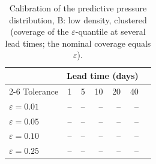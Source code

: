 \begin{table}[htbp]
\centering
\caption{Calibration of the predictive pressure distribution, B: low density, clustered
(coverage of the $\varepsilon$-quantile at several lead times; the nominal
coverage equals $\varepsilon$).}
\label{tab:ch6-calibration-B}
\begin{tabular}{@{}lrrrrrr@{}}
\toprule
& \multicolumn{5}{c}{Lead time (days)} \\
\cmidrule(r){2-6}
Tolerance & 1 & 5 & 10 & 20 & 40 \\
\midrule

$\varepsilon=0.01$ & -- & -- & -- & -- & -- \\
$\varepsilon=0.05$ & -- & -- & -- & -- & -- \\
$\varepsilon=0.10$ & -- & -- & -- & -- & -- \\
$\varepsilon=0.25$ & -- & -- & -- & -- & -- \\
\bottomrule
\end{tabular}
\end{table}
